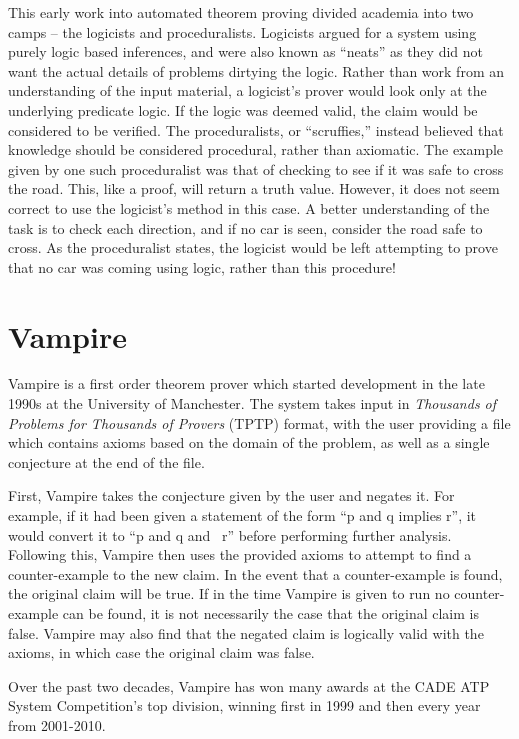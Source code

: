 This early work into automated theorem proving divided academia into two camps -- the logicists and proceduralists. Logicists argued for a system using purely logic based inferences, and were also known as ``neats'' as they did not want the actual details of problems dirtying the logic. Rather than work from an understanding of the input material, a logicist's prover would look only at the underlying predicate logic. If the logic was deemed valid, the claim would be considered to be verified. The proceduralists, or ``scruffies,'' instead believed that knowledge should be considered procedural, rather than axiomatic. The example given by one such proceduralist was that of checking to see if it was safe to cross the road. This, like a proof, will return a truth value. However, it does not seem correct to use the logicist's method in this case. A better understanding of the task is to check each direction, and if no car is seen, consider the road safe to cross. As the proceduralist states, the logicist would be left attempting to prove that no car was coming using logic, rather than this procedure! \cite{ATP History}



\section{Vampire}

Vampire is a first order theorem prover which started development in the late 1990s at the University of Manchester. The system takes input in \textit{Thousands of Problems for Thousands of Provers} (TPTP) format, with the user providing a file which contains axioms based on the domain of the problem, as well as a single conjecture at the end of the file.

First, Vampire takes the conjecture given by the user and negates it. For example, if it had been given a statement of the form ``p and q implies r'', it would convert it to ``p and q and ~r'' before performing further analysis. Following this, Vampire then uses the provided axioms to attempt to find a counter-example to the new claim. In the event that a counter-example is found, the original claim will be true. If in the time Vampire is given to run no counter-example can be found, it is not necessarily the case that the original claim is false. Vampire may also find that the negated claim is logically valid with the axioms, in which case the original claim was false.

Over the past two decades, Vampire has won many awards at the CADE ATP System Competition's top division, winning first in 1999 and then every year from 2001-2010.
